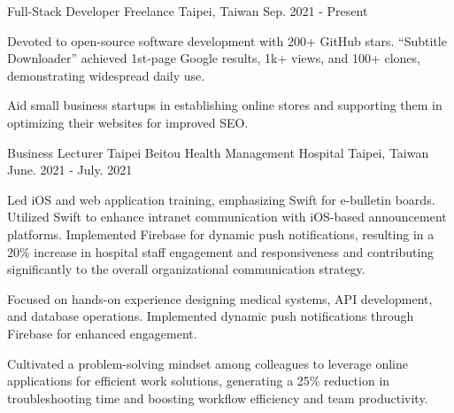 

\begin{cventries}

  \cventry
    {Full-Stack Developer} %
    {Freelance} %
    {Taipei, Taiwan} %
    {Sep. 2021 - Present} %
    {
      \begin{cvitems} %
        \item {Devoted to open-source software development with 200+ GitHub stars. “Subtitle Downloader” achieved 1st-page Google results, 1k+ views, and 100+ clones, demonstrating widespread daily use.}
        \item {Aid small business startups in establishing online stores and supporting them in optimizing their websites for improved SEO.}
      \end{cvitems}
    }

  \cventry
  {Business Lecturer} %
  {Taipei Beitou Health Management Hospital} %
  {Taipei, Taiwan} %
  {June. 2021 - July. 2021} %
  {
    \begin{cvitems} %
      \item {Led iOS and web application training, emphasizing Swift for e-bulletin boards. Utilized Swift to enhance intranet communication with iOS-based announcement platforms. Implemented Firebase for dynamic push notifications, resulting in a 20\% increase in hospital staff engagement and responsiveness and contributing significantly to the overall organizational communication strategy.}
      \item {Focused on hands-on experience designing medical systems, API development, and database operations. Implemented dynamic push notifications through Firebase for enhanced engagement.}
      \item {Cultivated a problem-solving mindset among colleagues to leverage online applications for efficient work solutions, generating a 25\% reduction in troubleshooting time and boosting workflow efficiency and team productivity.}
    \end{cvitems}
  }


\end{cventries}
